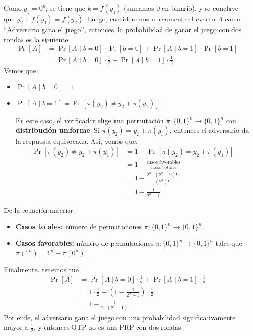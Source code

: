 Como $y_1 = 0^n$, se tiene que $k = f(y_1)$ (sumamos 0 en binario), y se concluye que $y_2 + f(y_1) = f(y_2)$. Luego, consideremos nuevamente el evento $A$ como ``Adversario gana el juego'', entonces, la probabilidad de ganar el juego con dos rondas es la siguiente:
\begin{align*}
    \Pr[A] & = \Pr[A \mid b = 0] \cdot \Pr[b = 0] + \Pr[A \mid b = 1] \cdot \Pr[b = 1]   \\
           & = \Pr[A \mid b = 0] \cdot \frac{1}{2} + \Pr[A \mid b = 1] \cdot \frac{1}{2}
\end{align*}
Vemos que:
\begin{itemize}
    \item $\Pr[A \mid b = 0] = 1$
    \item $\Pr[A \mid b = 1] = \Pr[\pi(y_2) \neq y_2 + \pi(y_1)]$

          En este caso, el verificador elige una permutación $\pi:\{0,1\}^n \to \{0,1\}^n$ con \textbf{distribución uniforme}. Si $\pi(y_2) = y_2 + \pi(y_1)$, entonces el adversario da la respuesta equivocada. Así, vemos que:
          \begin{align*}
              \Pr[\pi(y_2) \neq y_2 + \pi(y_1)] & = 1 - \Pr[\pi(y_2) = y_2 + \pi(y_1)]                       \\
                                                & = 1 - \frac{\text{casos favorables}}{\text{casos totales}} \\
                                                & = 1 - \frac{2^n \cdot (2^n - 2)!}{(2^n)!}                  \\
                                                & = 1 - \frac{1}{2^n - 1}
          \end{align*}
\end{itemize}
De la ecuación anterior:
\begin{itemize}
    \item \textbf{Casos totales:} número de permutaciones $\pi:\{0,1\}^n\to\{0,1\}^n$.
    \item \textbf{Casos favorables:} número de permutaciones $\pi:\{0,1\}^n\to\{0,1\}^n$ tales que $\pi(1^n) = 1^n + \pi(0^n)$.
\end{itemize}
Finalmente, tenemos que
\begin{align*}
    \Pr[A] & = \Pr[A \mid b = 0] \cdot \frac{1}{2} + \Pr[A \mid b = 1] \cdot \frac{1}{2}  \\
           & = 1 \cdot \frac{1}{2} + \left(1 - \frac{1}{2^n - 1}\right) \cdot \frac{1}{2} \\
           & = 1 - \frac{1}{2 \cdot (2^n - 1)}
\end{align*}
Por ende, el adversario gana el juego con una probabilidad significativamente mayor a $\frac{1}{2}$, y entonces OTP no es una PRP con dos rondas.

